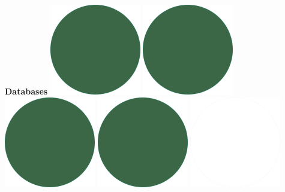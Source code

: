 \documentclass[]{commands}
\begin{document}
\begin{aside}
\textbf{Databases}\hfill
\includegraphics[scale=0.11]{img/IPSGreenDots.png}
\includegraphics[scale=0.11]{img/IPSGreenDots.png}
\includegraphics[scale=0.11]{img/IPSGreenDots.png}
\includegraphics[scale=0.11]{img/IPSGreenDots.png}
\includegraphics[scale=0.11]{img/WhiteDots.png}


\end{aside}
\end{document}
